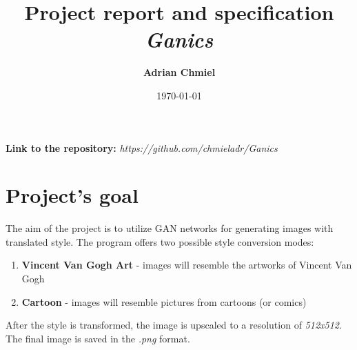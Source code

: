 \documentclass{article}
\begin{document}
\title{\textbf{Project report and specification}
\\ \large{\textit{Ganics}}}
\author{\textbf{Adrian Chmiel}}
\date{\today}
\maketitle

\textbf{Link to the repository:} \textit{https://github.com/chmieladr/Ganics}

\section{Project's goal}
The aim of the project is to utilize GAN networks for generating images with translated style. The program offers two possible style conversion modes:
\begin{enumerate}[label=\arabic*.]
    \setlength\itemsep{0pt}
    \item \textbf{Vincent Van Gogh Art} - images will resemble the artworks of Vincent Van Gogh
    \item \textbf{Cartoon} - images will resemble pictures from cartoons (or comics)
\end{enumerate}
After the style is transformed, the image is upscaled to a resolution of \textit{512x512}. The final image is saved in the \textit{.png} format.
\end{document}

